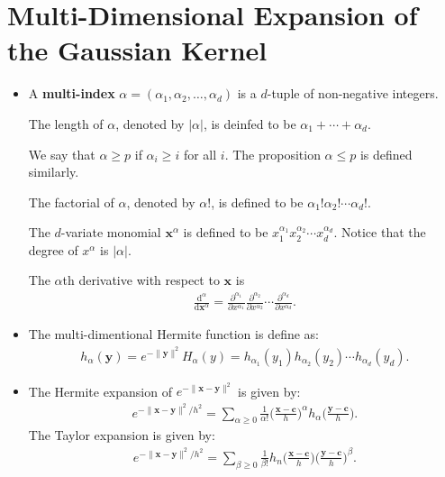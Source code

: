 \documentclass[10pt]{article}
\newcommand{\dee}{\mathrm{d}}
\newcommand{\ve}[1]{\mathbf{#1}}
\begin{document}
\section{Multi-Dimensional Expansion of the Gaussian Kernel}
  
\begin{itemize}
  \item A {\bf multi-index} $\alpha = (\alpha_1, \alpha_2, \dotsc, \alpha_d)$ is a $d$-tuple of non-negative integers. 
  
  The length of $\alpha$, denoted by $|\alpha|$, is deinfed to be $\alpha_1 + \dotsb + \alpha_d$.
  
  We say that $\alpha \geq p$ if $\alpha_i \geq i$ for all $i$. The proposition $\alpha \leq p$ is defined similarly.
  
  The factorial of $\alpha$, denoted by $\alpha!$, is defined to be $\alpha_1! \alpha_2! \dotsm \alpha_d!$.
  
  The $d$-variate monomial $\ve{x}^\alpha$ is defined to be $x_1^{\alpha_1} x_2^{\alpha_2} \dotsm x_d^{\alpha_d}$. Notice that the degree of $x^\alpha$ is $|\alpha|$.  
  
  The $\alpha$th derivative with respect to $\ve{x}$ is
  \begin{align*}
    \frac{\dee^\alpha}{\dee \ve{x}^\alpha} = \frac{\partial^{\alpha_1}}{\partial x^{\alpha_1}} \frac{\partial^{\alpha_2}}{\partial x^{\alpha_2}} \dotsm \frac{\partial^{\alpha_d}}{\partial x^{\alpha_d}}.
  \end{align*}
  
  \item The multi-dimentional Hermite function is define as:
  \begin{align*}
    h_\alpha(\ve{y}) = e^{-\| \ve{y} \|^2} H_\alpha(y) = h_{\alpha_1}(y_1) h_{\alpha_2}(y_2) \dotsm h_{\alpha_d}(y_d).
  \end{align*}
  
  \item The Hermite expansion of $e^{-\| \ve{x} - \ve{y} \|^2}$ is given by:
  \begin{align*}
    e^{-\| \ve{x} - \ve{y} \|^2/h^2} = \sum_{\alpha \geq 0} \frac{1}{\alpha!} \bigg( \frac{\ve{x} - \ve{c}}{h} \bigg)^\alpha h_\alpha\bigg( \frac{\ve{y} - \ve{c}}{h} \bigg).
  \end{align*}
  The Taylor expansion is given by:
    \begin{align*}
    e^{-\| \ve{x} - \ve{y} \|^2/h^2} = \sum_{\beta \geq 0} \frac{1}{\beta!} h_n \bigg( \frac{\ve{x} - \ve{c}}{h} \bigg) \bigg( \frac{\ve{y} - \ve{c}}{h} \bigg)^\beta.
  \end{align*}
  

\end{itemize}
\end{document}

